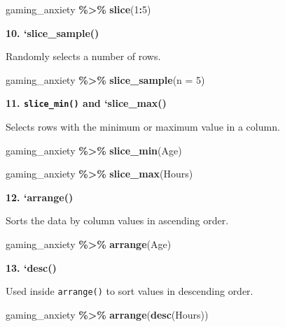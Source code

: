 \documentclass[
]{book}
\newenvironment{Shaded}{\begin{snugshade}}{\end{snugshade}}
\newcommand{\AttributeTok}[1]{\textcolor[rgb]{0.13,0.29,0.53}{#1}}
\newcommand{\DecValTok}[1]{\textcolor[rgb]{0.00,0.00,0.81}{#1}}
\newcommand{\FunctionTok}[1]{\textcolor[rgb]{0.13,0.29,0.53}{\textbf{#1}}}
\newcommand{\NormalTok}[1]{#1}
\newcommand{\SpecialCharTok}[1]{\textcolor[rgb]{0.81,0.36,0.00}{\textbf{#1}}}
\begin{document}
\begin{Shaded}
\begin{Highlighting}[]
\NormalTok{gaming\_anxiety }\SpecialCharTok{\%\textgreater{}\%}
  \FunctionTok{slice}\NormalTok{(}\DecValTok{1}\SpecialCharTok{:}\DecValTok{5}\NormalTok{)}
\end{Highlighting}
\end{Shaded}

\textbf{10. `slice\_sample()}

Randomly selects a number of rows.

\begin{Shaded}
\begin{Highlighting}[]
\NormalTok{gaming\_anxiety }\SpecialCharTok{\%\textgreater{}\%}
  \FunctionTok{slice\_sample}\NormalTok{(}\AttributeTok{n =} \DecValTok{5}\NormalTok{)}
\end{Highlighting}
\end{Shaded}

\textbf{11. \texttt{slice\_min()} and `slice\_max()}

Selects rows with the minimum or maximum value in a column.

\begin{Shaded}
\begin{Highlighting}[]
\NormalTok{gaming\_anxiety }\SpecialCharTok{\%\textgreater{}\%}
  \FunctionTok{slice\_min}\NormalTok{(Age)}

\NormalTok{gaming\_anxiety }\SpecialCharTok{\%\textgreater{}\%}
  \FunctionTok{slice\_max}\NormalTok{(Hours)}
\end{Highlighting}
\end{Shaded}

\textbf{12. `arrange()}

Sorts the data by column values in ascending order.

\begin{Shaded}
\begin{Highlighting}[]
\NormalTok{gaming\_anxiety }\SpecialCharTok{\%\textgreater{}\%}
  \FunctionTok{arrange}\NormalTok{(Age)}
\end{Highlighting}
\end{Shaded}

\textbf{13. `desc()}

Used inside \texttt{arrange()} to sort values in descending order.

\begin{Shaded}
\begin{Highlighting}[]
\NormalTok{gaming\_anxiety }\SpecialCharTok{\%\textgreater{}\%}
  \FunctionTok{arrange}\NormalTok{(}\FunctionTok{desc}\NormalTok{(Hours))}
\end{Highlighting}
\end{Shaded}
\end{document}
